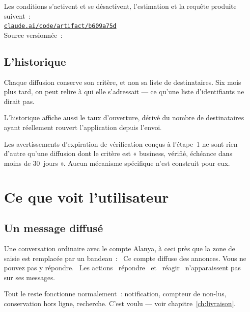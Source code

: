 \begin{note}
Les conditions s'activent et se désactivent, l'estimation et la requête produite suivent~:\\
\href{https://claude.ai/code/artifact/b609a75d-ea57-490a-8df4-2fe31d9df609}%
{\texttt{claude.ai/code/artifact/b609a75d}}\\
Source versionnée~: 
\end{note}

\section{L'historique}

Chaque diffusion conserve son critère, et non sa liste de destinataires. Six mois plus tard,
on peut relire à qui elle s'adressait --- ce qu'une liste d'identifiants ne dirait pas.

L'historique affiche aussi le taux d'ouverture, dérivé du nombre de destinataires ayant
réellement rouvert l'application depuis l'envoi.

\begin{note}
Les avertissements d'expiration de vérification conçus à l'étape~1 ne sont rien d'autre
qu'une diffusion dont le critère est « business, vérifié, échéance dans moins de 30~jours ».
Aucun mécanisme spécifique n'est construit pour eux.
\end{note}

\chapter{Ce que voit l'utilisateur}

\section{Un message diffusé}

Une conversation ordinaire avec le compte Alanya, à ceci près que la zone de saisie est
remplacée par un bandeau~: \guillemotleft~Ce compte diffuse des annonces. Vous ne pouvez pas
y répondre.~\guillemotright{} Les actions \guillemotleft~répondre~\guillemotright{} et
\guillemotleft~réagir~\guillemotright{} n'apparaissent pas sur ses messages.

Tout le reste fonctionne normalement~: notification, compteur de non-lus, conservation hors
ligne, recherche. C'est voulu --- voir chapitre~\ref{ch:livraison}.

